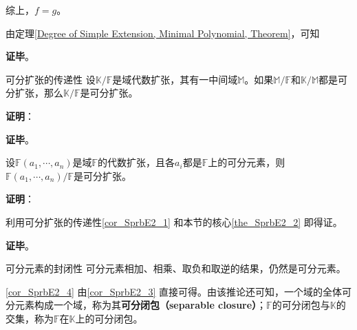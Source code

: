 综上，$f=g$。

由定理\ref{Degree of Simple Extension, Minimal Polynomial, Theorem}，可知

\textbf{证毕}。











\begin{corollary}{可分扩张的传递性}\label{cor_SprbE2_1}
设$\mathbb{K}/\mathbb{F}$是域代数扩张，其有一中间域$\mathbb{M}$。如果$\mathbb{M}/\mathbb{F}$和$\mathbb{K}/\mathbb{M}$都是可分扩张，那么$\mathbb{K}/\mathbb{F}$是可分扩张。
\end{corollary}

\textbf{证明}：



\textbf{证毕}。





\begin{corollary}{}\label{cor_SprbE2_3}
设$\mathbb{F}(a_1, \cdots, a_n)$是域$\mathbb{F}$的代数扩张，且各$a_i$都是$\mathbb{F}$上的可分元素，则$\mathbb{F}(a_1, \cdots, a_n)/\mathbb{F}$是可分扩张。
\end{corollary}

\textbf{证明}：

利用可分扩张的传递性\autoref{cor_SprbE2_1} 和本节的核心\autoref{the_SprbE2_2} 即得证。

\textbf{证毕}。





\begin{corollary}{可分元素的封闭性}\label{cor_SprbE2_4}
可分元素相加、相乘、取负和取逆的结果，仍然是可分元素。
\end{corollary}

\autoref{cor_SprbE2_4} 由\autoref{cor_SprbE2_3} 直接可得。由该推论还可知，一个域的全体可分元素构成一个域，称为其\textbf{可分闭包（separable closure）}；$\mathbb{F}$的可分闭包与$\mathbb{K}$的交集，称为$\mathbb{F}$在$\mathbb{K}$上的可分闭包。











